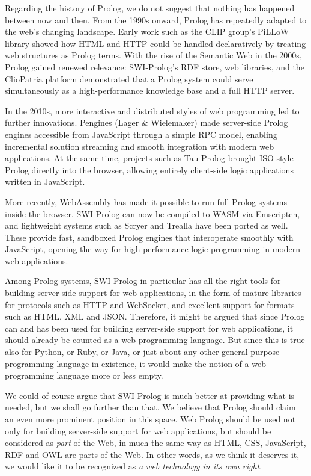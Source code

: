 Regarding the history of Prolog, we do not suggest that nothing has happened between now and then.
From the 1990s onward, Prolog has repeatedly adapted to the web's changing landscape. Early work such as the CLIP group's PiLLoW library showed how HTML and HTTP could be handled declaratively by treating web structures as Prolog terms. With the rise of the Semantic Web in the 2000s, Prolog gained renewed relevance: SWI-Prolog's RDF store, web libraries, and the ClioPatria platform demonstrated that a Prolog system could serve simultaneously as a high-performance knowledge base and a full HTTP server.

In the 2010s, more interactive and distributed styles of web programming led to further innovations. Pengines (Lager \& Wielemaker) made server-side Prolog engines accessible from JavaScript through a simple RPC model, enabling incremental solution streaming and smooth integration with modern web applications. At the same time, projects such as Tau Prolog brought ISO-style Prolog directly into the browser, allowing entirely client-side logic applications written in JavaScript.

More recently, WebAssembly has made it possible to run full Prolog systems inside the browser. SWI-Prolog can now be compiled to WASM via Emscripten, and lightweight systems such as Scryer and Trealla have been ported as well. These provide fast, sandboxed Prolog engines that interoperate smoothly with JavaScript, opening the way for high-performance logic programming in modern web applications.

Among Prolog systems, SWI-Prolog in particular has all the right tools for building server-side support for web applications, in the form of mature libraries for protocols such as HTTP and WebSocket, and excellent support for formats such as HTML, XML and JSON. Therefore, it might be argued that since Prolog can and has been used for building server-side support for web applications, it should already be counted as a web programming language. But since this is true also for Python, or Ruby, or Java, or just about any other general-purpose programming language in existence, it would make the notion of a web programming language more or less empty.

We could of course argue that SWI-Prolog is much better at providing what is needed, but we shall go further than that. We believe that Prolog should claim an even more prominent position in this space. Web Prolog should be used not only for building server-side support for web applications, but should be considered as \textit{part} of the Web, in much the same way as HTML, CSS, JavaScript, RDF and OWL are parts of the Web. In other words, as we think it deserves it, we would like it to be recognized as \textit{a web technology in its own right}.


